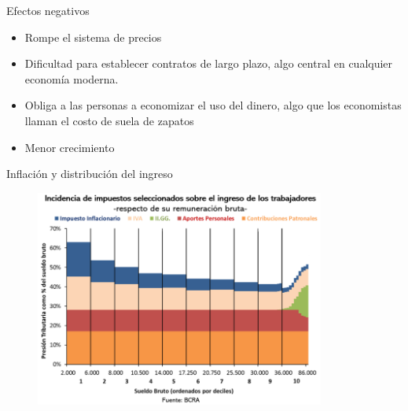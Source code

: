 \documentclass{beamer}
\begin{document}
\begin{frame}{Efectos negativos}
    \begin{itemize}
        \item Rompe el sistema de precios
        \item Dificultad para establecer contratos de largo plazo, algo central en cualquier economía moderna.
        \item  Obliga a las personas a economizar el uso del dinero, algo que los economistas llaman el costo de suela de zapatos
        \item Menor crecimiento
    \end{itemize}
\end{frame}

\begin{frame}{Inflación y distribución del ingreso}
    \begin{figure}[H]   
        \centering
        \includegraphics[width=0.85\textwidth]{../Figures/C38.17.png}\
    \end{figure}
\end{frame}
\end{document}
